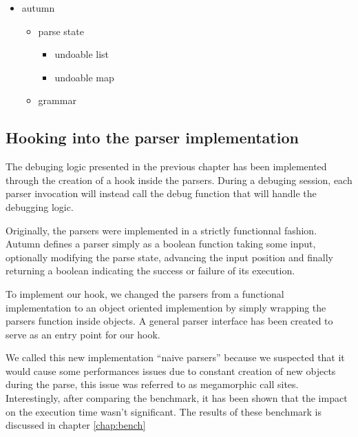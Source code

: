 \begin{itemize}
	\item autumn
	\begin{itemize}
		\item parse state
		\begin{itemize}
			\item undoable list
			\item undoable map
		\end{itemize}
		\item grammar
	\end{itemize}
\end{itemize}

	\subsection{Hooking into the parser implementation}
%
	The debuging logic presented in the previous chapter has been implemented through the creation of a hook inside the parsers. During a debuging session, each parser invocation will instead call the debug function that will handle the debugging logic.

	\bigskip

	Originally, the parsers were implemented in a strictly functionnal fashion. Autumn defines a parser simply as a boolean function taking some input, optionally modifying the parse state, advancing the input position and finally returning a boolean indicating the success or failure of its execution. 

	\bigskip

	To implement our hook, we changed the parsers from a functional implementation to an object oriented implemention by simply wrapping the parsers function inside objects.
	A general parser interface has been created to serve as an entry point for our hook.

	\bigskip

	We called this new implementation ``naive parsers'' because we suspected that it would cause some performances issues due to constant creation of new objects during the parse, this issue was referred to as megamorphic call sites. Interestingly, after comparing the benchmark, it has been shown that the impact on the execution time wasn't significant. The results of these benchmark is discussed in chapter \ref{chap:bench}


